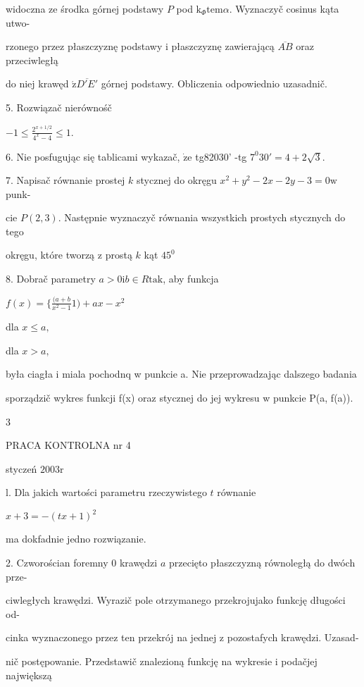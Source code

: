 \documentclass[a4paper,12pt]{article}
\begin{document}
widoczna ze środka górnej podstawy $P$ pod $\mathrm{k}_{\Phi}\mathrm{t}\mathrm{e}\mathrm{m}\alpha$. Wyznaczyč cosinus kąta utwo-

rzonego przez płaszczyznę podstawy $\mathrm{i}$ płaszczyznę zawierającą $\overline{AB}$ oraz przeciwległą

do niej krawęd $\acute{\mathrm{z}}\overline{D'E'}$ górnej podstawy. Obliczenia odpowiednio uzasadnič.

5. Rozwiązač nierównośč

$-1\displaystyle \leq\frac{2^{x+1/2}}{4^{x}-4}\leq 1.$

6. Nie posfugując się tablicami wykazač, $\dot{\mathrm{z}}\mathrm{e}$ tg82030' -tg $7^{0}30'=4+2\sqrt{3}.$

7. Napisač równanie prostej $k$ stycznej do okręgu $x^{2}+y^{2}-2x-2y-3=0\mathrm{w}$ punk-

cie $P(2,3)$. Następnie wyznaczyč równania wszystkich prostych stycznych do tego

okręgu, które tworzą $\mathrm{z}$ prostą $k$ kąt $45^{0}$

8. Dobrač parametry $a>0\mathrm{i}b\in R\mathrm{t}\mathrm{a}\mathrm{k}$, aby funkcja

$f(x)=\displaystyle \{\frac{(a+b}{x^{2}-1}1)+ax-x^{2}$

dla $x\leq a,$

dla $x>a,$

była ciagła i miala pochodnq w punkcie a. Nie przeprowadzając dalszego badania

sporządzič wykres funkcji f(x) oraz stycznej do jej wykresu w punkcie P(a, f(a)).

3





PRACA KONTROLNA nr 4

styczeń $2003\mathrm{r}$

l. Dla jakich wartości parametru rzeczywistego $t$ równanie

$x+3=-(tx+1)^{2}$

ma dokfadnie jedno rozwiązanie.

2. Czworościan foremny $0$ krawędzi $a$ przecięto płaszczyzną równoległą do dwóch prze-

ciwległych krawędzi. Wyrazič pole otrzymanego przekrojujako funkcję długości od-

cinka wyznaczonego przez ten przekrój na jednej $\mathrm{z}$ pozostafych krawędzi. Uzasad-

nič postępowanie. Przedstawič znalezioną funkcję na wykresie $\mathrm{i}$ podačjej największą
\end{document}
